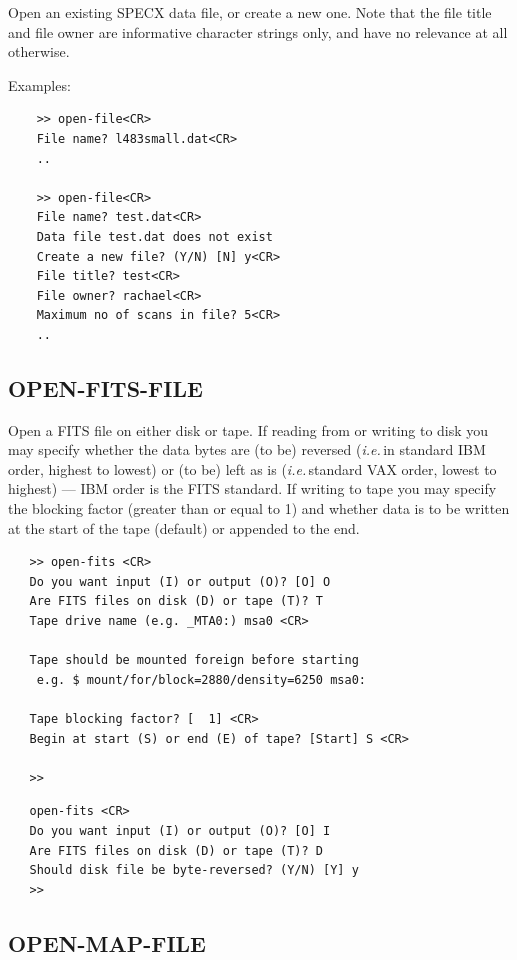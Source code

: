 \documentclass[11pt,twoside]{report}
\newcommand{\ie}{{\it i.e.\,}}
\begin{document}
Open an existing SPECX data file, or create a new one. Note that the
file title and file owner are informative character strings only, and
have no relevance at all otherwise.

Examples:
\begin{verbatim}
    >> open-file<CR>
    File name? l483small.dat<CR>
    ..

    >> open-file<CR>
    File name? test.dat<CR>
    Data file test.dat does not exist
    Create a new file? (Y/N) [N] y<CR>
    File title? test<CR>
    File owner? rachael<CR>
    Maximum no of scans in file? 5<CR>
    ..
\end{verbatim}

\subsection{OPEN-FITS-FILE} 

Open a FITS file on either disk or tape. If reading from or writing to disk you may
specify whether the data bytes are (to be) reversed (\ie in standard
IBM order, highest to lowest) or (to be) left as is (\ie standard VAX order,
lowest to highest) --- IBM order is the FITS standard. If writing to tape
you may specify the blocking factor (greater than or equal to 1) and whether
data is to be written at the start of the tape (default) or appended to the
end.

\begin{verbatim}
   >> open-fits <CR>
   Do you want input (I) or output (O)? [O] O
   Are FITS files on disk (D) or tape (T)? T
   Tape drive name (e.g. _MTA0:) msa0 <CR>

   Tape should be mounted foreign before starting
    e.g. $ mount/for/block=2880/density=6250 msa0:

   Tape blocking factor? [  1] <CR>
   Begin at start (S) or end (E) of tape? [Start] S <CR>

   >>
\end{verbatim}

\begin{verbatim}
   open-fits <CR>
   Do you want input (I) or output (O)? [O] I
   Are FITS files on disk (D) or tape (T)? D
   Should disk file be byte-reversed? (Y/N) [Y] y
   >>
\end{verbatim}

\subsection{OPEN-MAP-FILE} 
\end{document}

